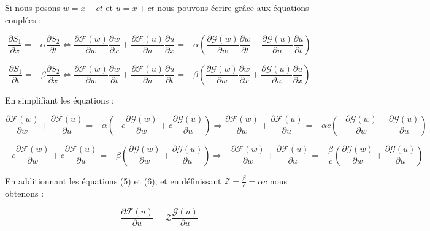 Si nous posons $w = x-ct$ et $u = x+ct$ nous pouvons écrire grâce aux équations couplées : 
\begin{fullwidth}
	\[\frac{\partial S_{1}}{\partial x} = -\alpha \frac{\partial S_{2}}{\partial t} \Leftrightarrow \frac{\partial \mathcal{F}(w)}{\partial w}\frac{\partial w}{\partial x} + \frac{\partial \mathcal{F}(u)}{\partial u}\frac{\partial u}{\partial x} 
	= -\alpha (\frac{\partial \mathcal{G}(w)}{\partial w}\frac{\partial w}{\partial t} + \frac{\partial \mathcal{G}(u)}{\partial u}\frac{\partial u}{\partial t})\]
	
	\[\frac{\partial S_{1}}{\partial t} = -\beta \frac{\partial S_{2}}{\partial x} \Leftrightarrow \frac{\partial \mathcal{F}(w)}{\partial w}\frac{\partial w}{\partial t} + \frac{\partial \mathcal{F}(u)}{\partial u}\frac{\partial u}{\partial t} 
	= -\beta (\frac{\partial \mathcal{G}(w)}{\partial w}\frac{\partial w}{\partial x} + \frac{\partial \mathcal{G}(u)}{\partial u}\frac{\partial u}{\partial x})\]
\end{fullwidth}	
	En simplifiant les équations : 
\begin{fullwidth}	
	\begin{equation}
	\frac{\partial \mathcal{F}(w)}{\partial w} + \frac{\partial \mathcal{F}(u)}{\partial u}
	= -\alpha (-c \frac{\partial \mathcal{G}(w)}{\partial w} + c \frac{\partial \mathcal{G}(u)}{\partial u}) \Rightarrow
	\frac{\partial \mathcal{F}(w)}{\partial w} + \frac{\partial \mathcal{F}(u)}{\partial u} = -\alpha c (-\frac{\partial \mathcal{G}(w)}{\partial w} +\frac{\partial \mathcal{G}(u)}{\partial u}) 
	\end{equation}
	
	\begin{equation}
	-c \frac{\partial \mathcal{F}(w)}{\partial w} + c \frac{\partial \mathcal{F}(u)}{\partial u}
	= -\beta (\frac{\partial \mathcal{G}(w)}{\partial w} + \frac{\partial \mathcal{G}(u)}{\partial u}) \Rightarrow -\frac{\partial \mathcal{F}(w)}{\partial w} + \frac{\partial \mathcal{F}(u)}{\partial u}
	= -\frac{\beta}{c} (\frac{\partial \mathcal{G}(w)}{\partial w} + \frac{\partial \mathcal{G}(u)}{\partial u})
	\end{equation}
\end{fullwidth}	

En additionnant les équations (5) et (6), et en définissant $\mathcal{Z} = \frac{\beta}{c} = \alpha c$ nous obtenons : 

\begin{equation}
 \frac{\partial \mathcal{F}(u)}{\partial u} =  \mathcal{Z} \frac{\mathcal{G}(u)}{\partial u}
\end{equation}

